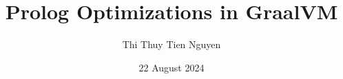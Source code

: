 \documentclass[instructions]{./Packages/uqthesis}
\title{Prolog Optimizations in GraalVM}
\author{Thi Thuy Tien Nguyen}
\date{22 August 2024}
\begin{document}
\frontmatter
\maketitle
\clearpage

\begin{KeepFromToc}
    \setcounter{page}{0} %
    \tableofcontents
\end{KeepFromToc}
\clearpage
\openany

\mainmatter









\end{document}
